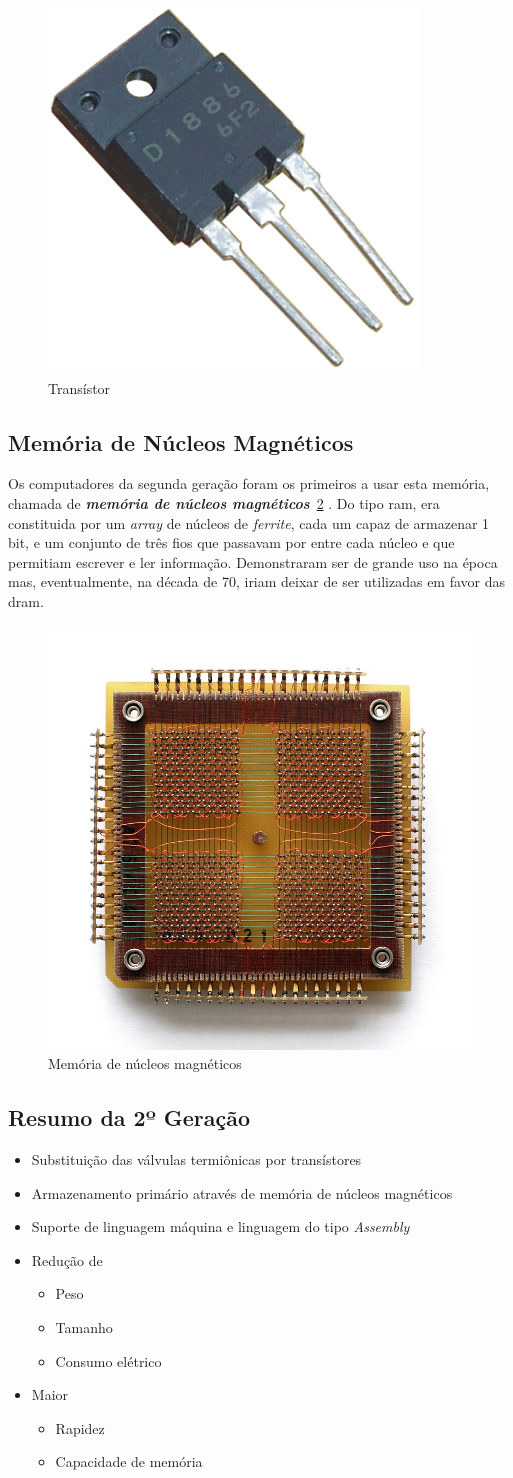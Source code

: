 \documentclass{report}
\begin{document}
\begin{figure}[H]
\centering
\includegraphics[width=0.2\linewidth]{transistor.jpg}
\caption{Transístor}
\label{trans}
\end{figure}

\subsection{Memória de Núcleos Magnéticos}
\label{sec:nucleo}
Os computadores da segunda geração foram os primeiros a usar esta memória, chamada de \textbf{\textit{memória de núcleos magnéticos}}~\ref{magn} \cite{memoriamagnetica}. Do tipo \acs{ram}, era constituida por um \textit{array} de núcleos de \textit{ferrite}, cada um capaz de armazenar 1 bit, e um conjunto de três fios que passavam por entre cada núcleo e que permitiam escrever e ler informação.
Demonstraram ser de grande uso na época mas, eventualmente, na década de 70, iriam deixar de ser utilizadas em favor das \acs{dram}.

\begin{figure}[H]
\centering
\includegraphics[width=0.2\linewidth]{memoriamagnetica.jpg}
\caption{Memória de núcleos magnéticos}
\label{magn}
\end{figure}


\subsection{Resumo da 2º Geração}
\begin{itemize}
   \item Substituição das válvulas termiônicas por transístores
   \item Armazenamento primário através de memória de núcleos magnéticos
   \item Suporte de linguagem máquina e linguagem do tipo \textit{Assembly}
   \item Redução de
   \begin{itemize}
     \item Peso
     \item Tamanho
     \item Consumo elétrico
   \end{itemize}
   \item Maior 
   \begin{itemize}
   \item Rapidez
   \item Capacidade de memória
   \end{itemize}
\end{itemize}
\end{document}
